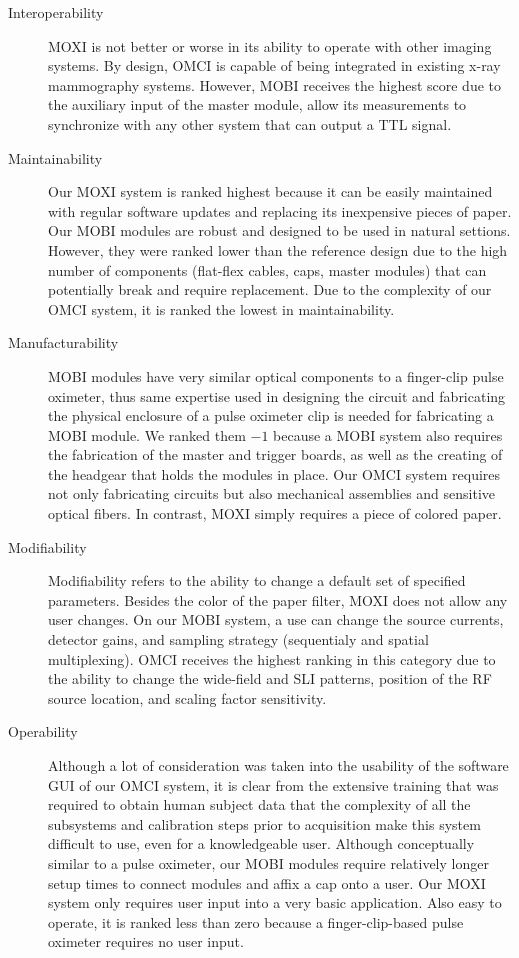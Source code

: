 \begin{description}
   \item[Interoperability] \ac{MOXI} is not better or worse in its ability to operate with other imaging systems. By design, \ac{OMCI} is capable of being integrated in existing x-ray mammography systems. However, \ac{MOBI} receives the highest score due to the auxiliary input of the master module, allow its measurements to synchronize with any other system that can output a \ac{TTL} signal. 
   
   \item[Maintainability] Our \ac{MOXI} system is ranked highest because it can be easily maintained with regular software updates and replacing its inexpensive pieces of paper. Our \ac{MOBI} modules are robust and designed to be used in natural settions. However, they were ranked lower than the reference design due to the high number of components (flat-flex cables, caps, master modules) that can potentially break and require replacement. Due to the complexity of our \ac{OMCI} system, it is ranked the lowest in maintainability.
   
   \item[Manufacturability] \ac{MOBI} modules have very similar optical components to a finger-clip pulse oximeter, thus same expertise used in designing the circuit and fabricating the physical enclosure of a pulse oximeter clip is needed for fabricating a \ac{MOBI} module. We ranked them $-1$ because a \ac{MOBI} system also requires the fabrication of the master and trigger boards, as well as the creating of the headgear that holds the modules in place. Our \ac{OMCI} system requires not only fabricating circuits but also mechanical assemblies and sensitive optical fibers. In contrast, \ac{MOXI} simply requires a piece of colored paper. 
   
   \item[Modifiability] Modifiability refers to the ability to change a default set of specified parameters. Besides the color of the paper filter, \ac{MOXI} does not allow any user changes. On our \ac{MOBI} system, a use can change the source currents, detector gains, and sampling strategy (sequentialy and spatial multiplexing). \ac{OMCI} receives the highest ranking in this category due to the ability to change the wide-field and \ac{SLI} patterns, position of the \ac{RF} source location, and scaling factor sensitivity. 
   
   \item[Operability] Although a lot of consideration was taken into the usability of the software \ac{GUI} of our \ac{OMCI} system, it is clear from the extensive training that was required to obtain human subject data that the complexity of all the subsystems and calibration steps prior to acquisition make this system difficult to use, even for a knowledgeable user. Although conceptually similar to a pulse oximeter, our \ac{MOBI} modules require relatively longer setup times to connect modules and affix a cap onto a user. Our \ac{MOXI} system only requires user input into a very basic application. Also easy to operate, it is ranked less than zero because a finger-clip-based pulse oximeter requires no user input.
   

\end{description}
